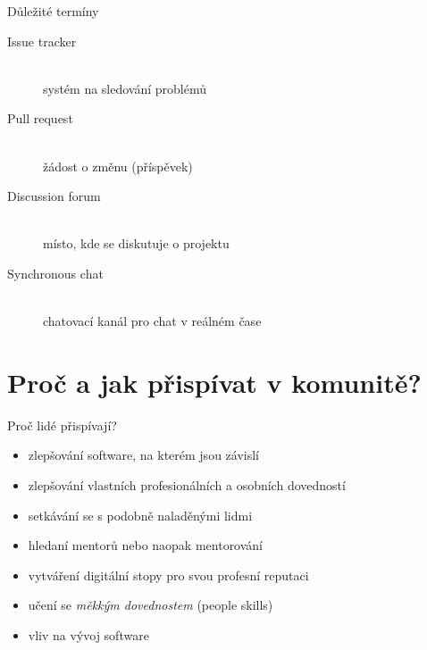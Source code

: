 \documentclass[11pt]{beamer}
\begin{document}
\begin{frame}{Důležité termíny}	
	\begin{description}
		\item[Issue tracker] \hfill \\ systém na sledování problémů
		\item[Pull request]  \hfill \\ žádost o změnu (příspěvek)
		\item[Discussion forum]  \hfill \\ místo, kde se diskutuje o projektu
		\item[Synchronous chat]  \hfill \\ chatovací kanál pro chat v reálném čase
	\end{description}
\end{frame}

\section{Proč a jak přispívat v komunitě?}

 \begin{frame}{Proč lidé přispívají?}
 	\begin{itemize}
 		\item zlepšování software, na kterém  jsou závislí
 		\item zlepšování vlastních profesionálních a osobních dovedností
 		\item setkávání se s podobně naladěnými lidmi
 		\item hledaní mentorů nebo naopak mentorování
 		\item vytváření digitální stopy pro svou profesní reputaci
 		\item učení se \textit{měkkým dovednostem} (people skills)
 		\item vliv na vývoj software
 	\end{itemize}
\end{frame}
\end{document}
